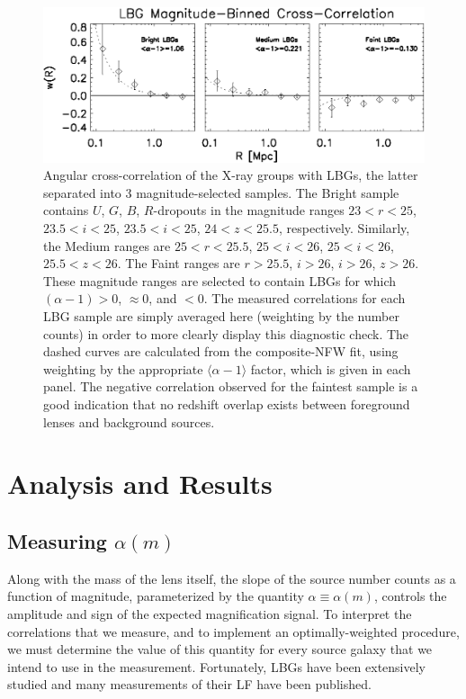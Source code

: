 \begin{figure}
\begin{center}
\includegraphics[scale=1.2]{plots_ch2/magbinnedLBGs_multiNFWfit.eps}
\caption[Magnitude-Binned Cross-Correlation]{Angular cross-correlation of the X-ray groups with \ac{LBG}s, the latter separated into 3 magnitude-selected samples.  The Bright sample contains $U$, $G$, $B$, $R$-dropouts in the magnitude ranges $23<r<25$, $23.5<i<25$,  $23.5<i<25$,  $24<z<25.5$, respectively. Similarly, the Medium ranges are $25<r<25.5$, $25<i<26$,  $25<i<26$,  $25.5<z<26$.  The Faint ranges are $r>25.5$, $i>26$,  $i>26$,  $z>26$. These magnitude ranges are selected to contain \ac{LBG}s for which $(\alpha-1)>0$, $\approx 0$, and $<0$.  The measured correlations for each \ac{LBG} sample are simply averaged here (weighting by the number counts) in order to more clearly display this diagnostic check. The dashed curves are calculated from the composite-\ac{NFW} fit, using weighting by the appropriate $\langle \alpha -1 \rangle$ factor, which is given in each panel. The negative correlation observed for the faintest sample is a good indication that no redshift overlap exists between foreground lenses and background sources.}
\label{plot:MagBinned2}
\end{center}
\end{figure}

\section{Analysis and Results}
\label{sec:results2}
\subsection{Measuring $\alpha(m)$}
\label{sec:alpha}
Along with the mass of the lens itself, the slope of the source number counts as a function of magnitude, parameterized by the quantity $\alpha \equiv \alpha(m)$, controls the amplitude and sign of the expected magnification signal.  To interpret the correlations that we measure, and to implement an optimally-weighted procedure, we must determine the value of this quantity for every source galaxy that we intend to use in the measurement.  Fortunately, \ac{LBG}s have been extensively studied and many measurements of their \ac{LF} have been published.  


